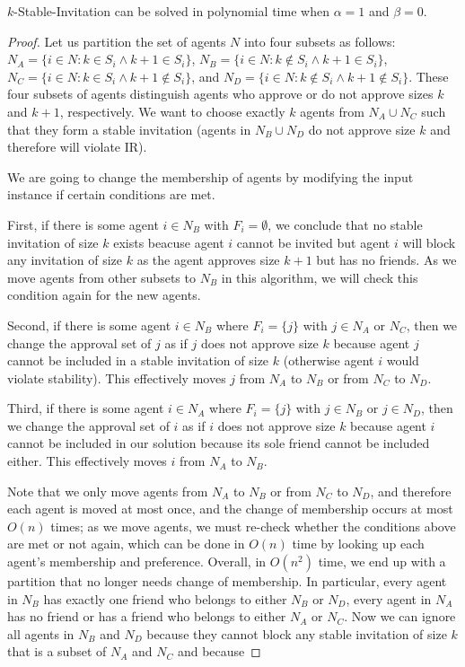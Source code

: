 \begin{theorem} \label{SIP:thm:easiness_stable_a1_b0}
	$k$-Stable-Invitation can be solved in polynomial time when $\alpha =1$ and $\beta = 0$.
\end{theorem} 
\begin{proof} %
Let us partition the set of agents $N$ into four subsets as follows:
$N_A = \{i \in N: k \in S_i \land k+1\in S_i\}$, 
$N_B = \{i \in N: k \not\in S_i \land k+1\in S_i\}$,
$N_C = \{i \in N: k \in S_i \land k+1 \not\in S_i\}$, and
$N_D = \{i \in N: k \not\in S_i \land k+1 \not\in S_i\}$. These four subsets of agents distinguish agents who approve or do not approve sizes $k$ and $k+1$, respectively. We want to choose exactly $k$ agents from $N_A \cup N_C$ such that they form a stable invitation (agents in $N_B \cup N_D$ do not approve size $k$ and therefore will violate IR).

We are going to change the membership of agents by modifying the input instance if certain conditions are met. 

First, if there is some agent $i\in N_B$ with $F_i = \emptyset$, we conclude that no stable invitation of size $k$ exists beacuse agent $i$ cannot be invited but agent $i$ will block any invitation of size $k$ as the agent approves size $k+1$ but has no friends. As we move agents from other subsets to $N_B$ in this algorithm, we will check this condition again for the new agents.

Second, if there is some agent $i\in N_B$ where $F_i = \{j\}$ with $j\in N_A$ or $N_C$, then we change the approval set of $j$ as if $j$ does not approve size $k$ because agent $j$ cannot be included in a stable invitation of size $k$ (otherwise agent $i$ would violate stability). This effectively moves $j$ from $N_A$ to $N_B$ or from $N_C$ to $N_D$.

Third, if there is some agent $i\in N_A$ where $F_i = \{j\}$ with $j\in N_B$ or $j\in N_D$, then we change the approval set of $i$ as if $i$ does not approve size $k$ because agent $i$ cannot be included in our solution because its sole friend cannot be included either. This effectively moves $i$ from $N_A$ to $N_B$. 

Note that we only move agents from $N_A$ to $N_B$ or from $N_C$ to $N_D$, and therefore each agent is moved at most once, and the change of membership occurs at most $O(n)$ times; as we move agents, we must re-check whether the conditions above are met or not again, which can be done in $O(n)$ time by looking up each agent's membership and preference. Overall, in $O(n^2)$ time, we end up with a partition that no longer needs change of membership. In particular, every agent in $N_B$ has exactly one friend who belongs to either $N_B$ or $N_D$, every agent in $N_A$ has no friend or has a friend who belongs to either $N_A$ or $N_C$. Now we can ignore all agents in $N_B$ and $N_D$ because they cannot block any stable invitation of size $k$ that is a subset of $N_A$ and $N_C$ and because 


\end{proof}

